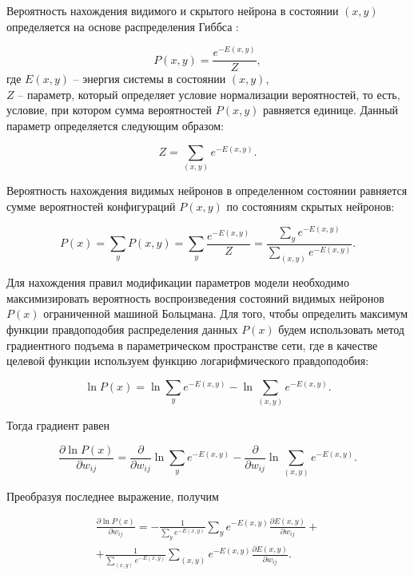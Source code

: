 Вероятность нахождения видимого и скрытого нейрона в состоянии $(x, y)$ определяется на основе распределения Гиббса \cite[c.~33]{gibbs1902}:
	
\begin{equation*}
	P(x, y)=\frac{e^{-E(x,y)}}{Z},
\end{equation*}
где $E(x,y)$ -- энергия системы в состоянии $(x,y)$,\\
$Z$ -- параметр, который определяет условие нормализации вероятностей, то есть, условие, при котором сумма вероятностей $P(x, y)$ равняется единице. Данный параметр определяется следующим образом:
	
\begin{equation*}
	Z=\sum_{(x,y)} e^{-E(x,y)}.
\end{equation*}
	
Вероятность нахождения видимых нейронов в определенном состоянии равняется сумме вероятностей  конфигураций $P(x,y)$ по состояниям скрытых нейронов:
	
\begin{equation*}
	P(x)=\sum_y P(x,y)=\sum_y \frac{e^{-E(x,y)}}{Z}=\frac{\sum_y e^{-E(x,y)}}{\sum_{(x,y)} e^{-E(x,y)}}.
\end{equation*}
	
Для нахождения правил модификации параметров модели необходимо максимизировать вероятность воспроизведения состояний видимых нейронов $P(x)$ ограниченной машиной Больцмана. Для того, чтобы определить максимум функции правдоподобия распределения данных $P(x)$ будем использовать метод градиентного подъема в параметрическом пространстве сети, где в качестве целевой функции используем функцию логарифмического правдоподобия:
	
\begin{equation*}
	\ln P(x)=\ln \sum_y e^{-E(x,y)}-\ln \sum_{(x,y)} e^{-E(x,y)}.
\end{equation*}
	
Тогда градиент равен
	
\begin{equation*}
	\frac{\partial \ln P(x)}{\partial w_{ij}}=\frac{\partial}{\partial w_{ij}}\ln \sum_y e^{-E(x,y)}-\frac{\partial}{\partial w_{ij}}\ln\sum_{(x,y)} e^{-E(x,y)}.
\end{equation*}
	
Преобразуя последнее выражение, получим
	
\begin{multline*}
	\frac{\partial \ln P(x)}{\partial w_{ij}}=-\frac{1}{\sum_y e^{-E(x,y)}}\sum_y e^{-E(x,y)}\frac{\partial E(x,y)}{\partial w_{ij}}+\\+\frac{1}{\sum_{(x,y)} e^{-E(x,y)}}\sum_{(x,y)} e^{-E(x,y)}\frac{\partial E(x,y)}{\partial w_{ij}}.
\end{multline*}
	
